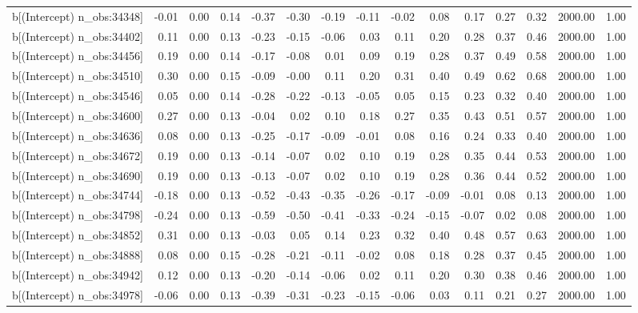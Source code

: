 \begin{table}[ht]
\begin{tabular}{rrrrrrrrrrrrrrr}
  b[(Intercept) n\_obs:34348] & -0.01 & 0.00 & 0.14 & -0.37 & -0.30 & -0.19 & -0.11 & -0.02 & 0.08 & 0.17 & 0.27 & 0.32 & 2000.00 & 1.00 \\ 
  b[(Intercept) n\_obs:34402] & 0.11 & 0.00 & 0.13 & -0.23 & -0.15 & -0.06 & 0.03 & 0.11 & 0.20 & 0.28 & 0.37 & 0.46 & 2000.00 & 1.00 \\ 
  b[(Intercept) n\_obs:34456] & 0.19 & 0.00 & 0.14 & -0.17 & -0.08 & 0.01 & 0.09 & 0.19 & 0.28 & 0.37 & 0.49 & 0.58 & 2000.00 & 1.00 \\ 
  b[(Intercept) n\_obs:34510] & 0.30 & 0.00 & 0.15 & -0.09 & -0.00 & 0.11 & 0.20 & 0.31 & 0.40 & 0.49 & 0.62 & 0.68 & 2000.00 & 1.00 \\ 
  b[(Intercept) n\_obs:34546] & 0.05 & 0.00 & 0.14 & -0.28 & -0.22 & -0.13 & -0.05 & 0.05 & 0.15 & 0.23 & 0.32 & 0.40 & 2000.00 & 1.00 \\ 
  b[(Intercept) n\_obs:34600] & 0.27 & 0.00 & 0.13 & -0.04 & 0.02 & 0.10 & 0.18 & 0.27 & 0.35 & 0.43 & 0.51 & 0.57 & 2000.00 & 1.00 \\ 
  b[(Intercept) n\_obs:34636] & 0.08 & 0.00 & 0.13 & -0.25 & -0.17 & -0.09 & -0.01 & 0.08 & 0.16 & 0.24 & 0.33 & 0.40 & 2000.00 & 1.00 \\ 
  b[(Intercept) n\_obs:34672] & 0.19 & 0.00 & 0.13 & -0.14 & -0.07 & 0.02 & 0.10 & 0.19 & 0.28 & 0.35 & 0.44 & 0.53 & 2000.00 & 1.00 \\ 
  b[(Intercept) n\_obs:34690] & 0.19 & 0.00 & 0.13 & -0.13 & -0.07 & 0.02 & 0.10 & 0.19 & 0.28 & 0.36 & 0.44 & 0.52 & 2000.00 & 1.00 \\ 
  b[(Intercept) n\_obs:34744] & -0.18 & 0.00 & 0.13 & -0.52 & -0.43 & -0.35 & -0.26 & -0.17 & -0.09 & -0.01 & 0.08 & 0.13 & 2000.00 & 1.00 \\ 
  b[(Intercept) n\_obs:34798] & -0.24 & 0.00 & 0.13 & -0.59 & -0.50 & -0.41 & -0.33 & -0.24 & -0.15 & -0.07 & 0.02 & 0.08 & 2000.00 & 1.00 \\ 
  b[(Intercept) n\_obs:34852] & 0.31 & 0.00 & 0.13 & -0.03 & 0.05 & 0.14 & 0.23 & 0.32 & 0.40 & 0.48 & 0.57 & 0.63 & 2000.00 & 1.00 \\ 
  b[(Intercept) n\_obs:34888] & 0.08 & 0.00 & 0.15 & -0.28 & -0.21 & -0.11 & -0.02 & 0.08 & 0.18 & 0.28 & 0.37 & 0.45 & 2000.00 & 1.00 \\ 
  b[(Intercept) n\_obs:34942] & 0.12 & 0.00 & 0.13 & -0.20 & -0.14 & -0.06 & 0.02 & 0.11 & 0.20 & 0.30 & 0.38 & 0.46 & 2000.00 & 1.00 \\ 
  b[(Intercept) n\_obs:34978] & -0.06 & 0.00 & 0.13 & -0.39 & -0.31 & -0.23 & -0.15 & -0.06 & 0.03 & 0.11 & 0.21 & 0.27 & 2000.00 & 1.00 \\ 

\end{tabular}
\end{table}
